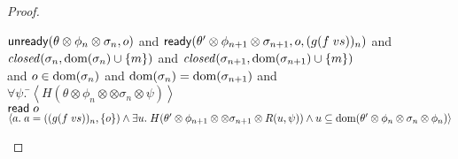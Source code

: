 \begin{proof}
\begin{tabbedproof}
\oo $\mathsf{unready}({\theta \otimes \phi_n \otimes \sigma_n}, {o})$ and $\mathsf{ready}({\theta' \otimes \phi_{n+1} \otimes \sigma_{n+1}}, {o}, {(g(f\;vs))_n})$ and \\
\oo $\mathit{closed}(\sigma_n, \mbox{dom}({\sigma_n}) \cup \{{m}\})$ and $\mathit{closed}(\sigma_{n+1}, \mbox{dom}({\sigma_{n+1}}) \cup \{{m}\})$ \\
\oo and $o \in \mbox{dom}({\sigma_n})$ and $\mbox{dom}({\sigma_n}) = \mbox{dom}({\sigma_{n+1}})$ and \\
\oo $\forall \psi.\;$\=$\left<H(\theta \otimes \phi_n \otimes \otimes \sigma_n \otimes \psi)\right>$ \\
\oo \> $\mathsf{read}\; o$ \\
\oo \> $\left<a.\;a = ((g(f\;vs))_n, \{{o}\}) \land \exists u.\; H(\theta' \otimes \phi_{n+1} \otimes \otimes \sigma_{n+1} \otimes R(u, \psi)) \land u \subseteq \mbox{dom}({\theta' \otimes \phi_n \otimes \sigma_n \otimes \phi_n})\right>$ \\






\end{tabbedproof}
\end{proof}
